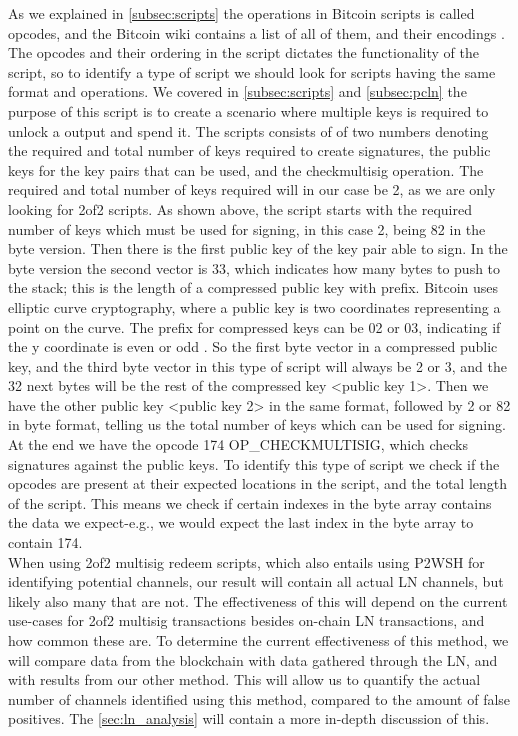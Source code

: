 As we explained in \cref{subsec:scripts} the operations in Bitcoin scripts is called opcodes, and the Bitcoin wiki contains a list of all of them, and their encodings \cite{bitcoin_wiki_scripts}. The opcodes and their ordering in the script dictates the functionality of the script, so to identify a type of script we should look for scripts having the same format and operations.
We covered in \cref{subsec:scripts} and \cref{subsec:pcln} the purpose of this script is to create a scenario where multiple keys is required to unlock a output and spend it.
The scripts consists of of two numbers denoting the required and total number of keys required to create signatures, the public keys for the key pairs that can be used, and the checkmultisig operation. The required and total number of keys required will in our case be 2, as we are only looking for 2of2 scripts.
As shown above, the script starts with the required number of keys which must be used for signing, in this case 2, being 82 in the byte version. Then there is the first public key of the key pair able to sign. 
In the byte version the second vector is 33, which indicates how many bytes to push to the stack; this is the length of a compressed public key with prefix. Bitcoin uses elliptic curve cryptography, where a public key is two coordinates representing a point on the curve. The prefix for compressed keys can be 02 or 03, indicating if the y coordinate is even or odd \cite{antonopoulos2017mastering}. So the first byte vector in a compressed public key, and the third byte vector in this type of script will always be 2 or 3, and the 32 next bytes will be the rest of the compressed key <public key 1>. Then we have the other public key <public key 2> in the same format, followed by 2 or 82 in byte format, telling us the total number of keys which can be used for signing. At the end we have the opcode 174 OP\_CHECKMULTISIG, which checks signatures against the public keys. To identify this type of script we check if the opcodes are present at their expected locations in the script, and the total length of the script. This means we check if certain indexes in the byte array contains the data we expect-e.g., we would expect the last index in the byte array to contain 174.
\\

When using 2of2 multisig redeem scripts, which also entails using P2WSH for identifying potential channels, our result will contain all actual LN channels, but likely also many that are not. The effectiveness of this will depend on the current use-cases for 2of2 multisig transactions besides on-chain LN transactions, and how common these are. To determine the current effectiveness of this method, we will compare data from the blockchain with data gathered through the LN, and with results from our other method. This will allow us to quantify the actual number of channels identified using this method, compared to the amount of false positives.
The \cref{sec:ln_analysis} will contain a more in-depth discussion of this.

